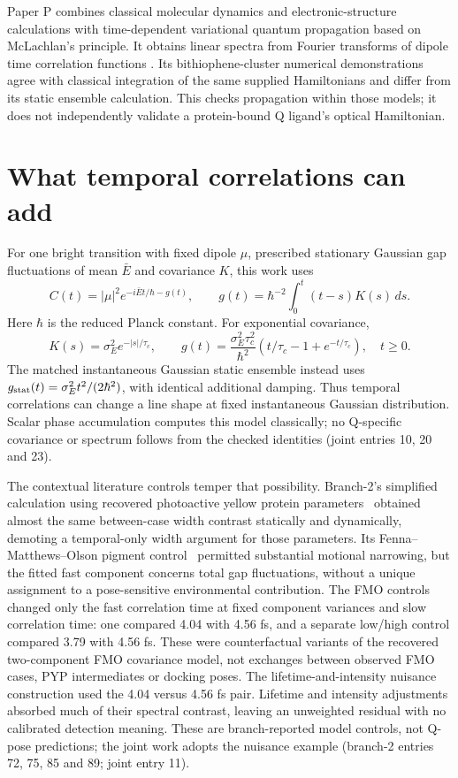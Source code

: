 \documentclass{article}
\begin{document}
Paper P combines classical molecular dynamics and electronic-structure calculations with time-dependent variational quantum propagation based on McLachlan's principle. It obtains linear spectra from Fourier transforms of dipole time correlation functions \cite{P}. Its bithiophene-cluster numerical demonstrations agree with classical integration of the same supplied Hamiltonians and differ from its static ensemble calculation. This checks propagation within those models; it does not independently validate a protein-bound Q ligand's optical Hamiltonian.

\section{What temporal correlations can add}

For one bright transition with fixed dipole \(\mu\), prescribed stationary Gaussian gap fluctuations of mean \(\bar E\) and covariance \(K\), this work uses
\[
 C(t)=|\mu|^2e^{-i\bar E t/\hbar-g(t)},\qquad
 g(t)=\hbar^{-2}\int_0^t(t-s)K(s)\,ds.
\]
Here \(\hbar\) is the reduced Planck constant. For exponential covariance,
\[
 K(s)=\sigma_E^2e^{-|s|/\tau_c},\qquad
 g(t)=\frac{\sigma_E^2\tau_c^2}{\hbar^2}
 \left(t/\tau_c-1+e^{-t/\tau_c}\right),\quad t\geq0.
\]
The matched instantaneous Gaussian static ensemble instead uses \(g_{\rm stat}(t)=\sigma_E^2t^2/(2\hbar^2)\), with identical additional damping. Thus temporal correlations can change a line shape at fixed instantaneous Gaussian distribution. Scalar phase accumulation computes this model classically; no Q-specific covariance or spectrum follows from the checked identities (joint entries 10, 20 and 23).

The contextual literature controls temper that possibility. Branch-2's simplified calculation using recovered photoactive yellow protein parameters~\cite{PYP} obtained almost the same between-case width contrast statically and dynamically, demoting a temporal-only width argument for those parameters. Its Fenna--Matthews--Olson pigment control~\cite{FMO} permitted substantial motional narrowing, but the fitted fast component concerns total gap fluctuations, without a unique assignment to a pose-sensitive environmental contribution. The FMO controls changed only the fast correlation time at fixed component variances and slow correlation time: one compared 4.04 with 4.56 fs, and a separate low/high control compared 3.79 with 4.56 fs. These were counterfactual variants of the recovered two-component FMO covariance model, not exchanges between observed FMO cases, PYP intermediates or docking poses. The lifetime-and-intensity nuisance construction used the 4.04 versus 4.56 fs pair. Lifetime and intensity adjustments absorbed much of their spectral contrast, leaving an unweighted residual with no calibrated detection meaning. These are branch-reported model controls, not Q-pose predictions; the joint work adopts the nuisance example (branch-2 entries 72, 75, 85 and 89; joint entry 11).
\end{document}
